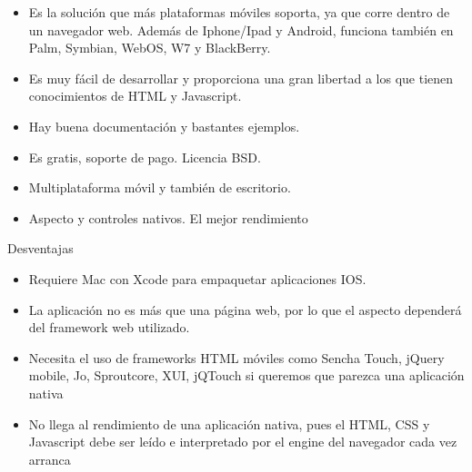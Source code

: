 \begin{itemize}

\item Es la solución que más plataformas móviles soporta, ya que corre dentro de un navegador web. Además de Iphone/Ipad y Android, funciona también en Palm, Symbian, WebOS, W7 y BlackBerry.

\item Es muy fácil de desarrollar y proporciona una gran libertad a los que tienen conocimientos de HTML y Javascript.

\item Hay buena documentación y bastantes ejemplos.

\item Es gratis, soporte de pago. Licencia BSD.

\item Multiplataforma móvil y también de escritorio.

\item Aspecto y controles nativos. El mejor rendimiento

\end{itemize}

Desventajas

\begin{itemize}

\item Requiere Mac con Xcode para empaquetar aplicaciones IOS.

\item  La aplicación no es más que una página web, por lo que el aspecto dependerá del framework web utilizado.

\item  Necesita el uso de frameworks HTML móviles como Sencha Touch, jQuery mobile, Jo, Sproutcore, XUI, jQTouch si queremos que parezca una aplicación nativa

\item  No llega al rendimiento de una aplicación nativa, pues el HTML, CSS y Javascript debe ser leído e interpretado por el engine del navegador cada vez arranca

\end{itemize}


